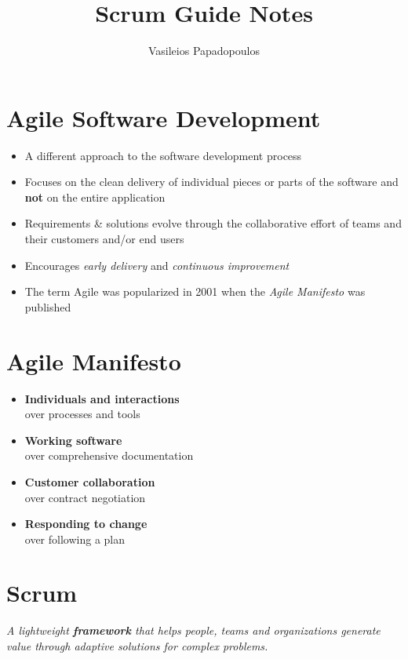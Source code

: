 \documentclass[a4paper,11pt,twocolumn]{article}
\title{\textbf{Scrum Guide Notes} \vspace{-2ex}}
\author{Vasileios Papadopoulos}
\date{}
\begin{document}
\maketitle

\thispagestyle{fancy}

\section*{Agile Software Development}
\begin{itemize}
	\item A different approach to the software development process
	\item Focuses on the clean delivery of individual pieces or parts of the software and \textbf{not} on the entire application
	\item Requirements \& solutions evolve through the collaborative effort of teams and their customers and/or end users
	\item Encourages \textit{early delivery} and \textit{continuous improvement}
	\item The term Agile was popularized in 2001 when the \textit{Agile Manifesto} was published
\end{itemize}

\section*{Agile Manifesto}
\begin{itemize}
	\item \textbf{Individuals and interactions}\\
	      over processes and tools
	\item \textbf{Working software}\\
	      over comprehensive documentation
	\item \textbf{Customer collaboration}\\
	      over contract negotiation
	\item \textbf{Responding to change}\\
	      over following a plan
\end{itemize}

\section*{Scrum}
\textit{A lightweight \textbf{framework} that helps people, teams and organizations generate value through adaptive solutions for complex problems.}
\end{document}
